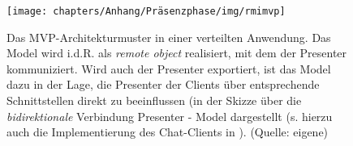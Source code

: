 \begin{figure}
    \centering
    \texttt{[image: chapters/Anhang/Präsenzphase/img/rmimvp]}
    \caption{Das MVP-Architekturmuster in einer verteilten Anwendung. Das Model wird i.d.R. als \textit{remote object} realisiert, mit dem der Presenter kommuniziert.
    Wird auch der Presenter exportiert, ist das Model dazu in der Lage, die Presenter der Clients über entsprechende Schnittstellen direkt zu beeinflussen (in der Skizze über die \textit{bidirektionale} Verbindung Presenter - Model dargestellt (s. hierzu auch die Implementierung des Chat-Clients in \cite[349, Bild 6.12]{Oec22}). (Quelle: eigene)}
    \label{fig:rmimvp}
\end{figure}
